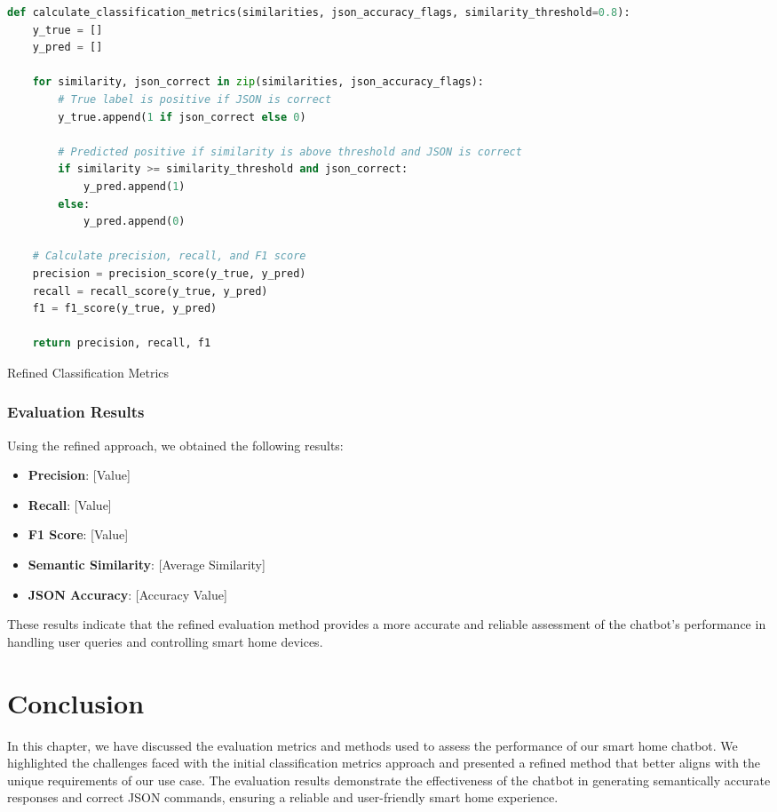 \begin{Listing}
    \begin{lstlisting}[language=Python]
    def calculate_classification_metrics(similarities, json_accuracy_flags, similarity_threshold=0.8):
    y_true = []
    y_pred = []

    for similarity, json_correct in zip(similarities, json_accuracy_flags):
        # True label is positive if JSON is correct
        y_true.append(1 if json_correct else 0)

        # Predicted positive if similarity is above threshold and JSON is correct
        if similarity >= similarity_threshold and json_correct:
            y_pred.append(1)
        else:
            y_pred.append(0)

    # Calculate precision, recall, and F1 score
    precision = precision_score(y_true, y_pred)
    recall = recall_score(y_true, y_pred)
    f1 = f1_score(y_true, y_pred)

    return precision, recall, f1
  \end{lstlisting}
    \caption{Refined Classification Metrics}
    \label{lst:classificationRefined}
\end{Listing}

\subsubsection{Evaluation Results}

Using the refined approach, we obtained the following results:
\begin{itemize}
    \item \textbf{Precision}: [Value]
    \item \textbf{Recall}: [Value]
    \item \textbf{F1 Score}: [Value]
    \item \textbf{Semantic Similarity}: [Average Similarity]
    \item \textbf{JSON Accuracy}: [Accuracy Value]
\end{itemize}

These results indicate that the refined evaluation method provides a more accurate and reliable assessment of the chatbot's performance in handling user queries and controlling smart home devices.
\section{Conclusion}

In this chapter, we have discussed the evaluation metrics and methods used to assess the performance of our smart home chatbot. We highlighted the challenges faced with the initial classification metrics approach and presented a refined method that better aligns with the unique requirements of our use case. The evaluation results demonstrate the effectiveness of the chatbot in generating semantically accurate responses and correct JSON commands, ensuring a reliable and user-friendly smart home experience.

